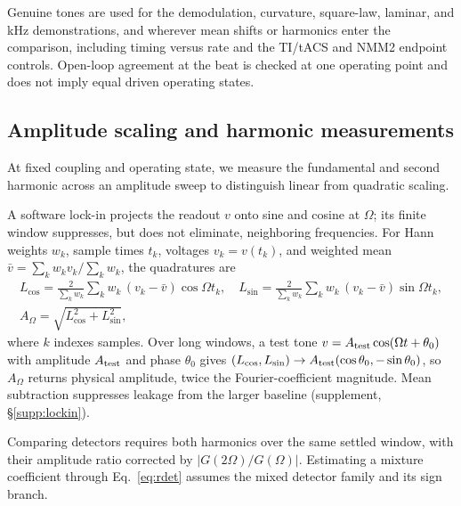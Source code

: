 \documentclass[a4paper]{article}
\newif\ifjne
\begin{document}
Genuine tones are used for the demodulation, curvature, square-law, laminar, and kHz
demonstrations, and wherever mean shifts or harmonics enter the comparison, including
timing versus rate and the TI/tACS and NMM2 endpoint controls. Open-loop agreement at
the beat is checked at one operating point and does not imply equal driven operating
states.

\subsection{Amplitude scaling and harmonic measurements}\label{sec:transduction-methods}
At fixed coupling and operating state, we measure the fundamental and second
harmonic across an amplitude sweep to distinguish linear from quadratic scaling.

A software lock-in projects the readout $v$ onto sine and cosine at $\Omega$; its
finite window suppresses, but does not eliminate, neighboring frequencies. For Hann
weights $w_k$, sample times $t_k$, voltages $v_k=v(t_k)$, and weighted mean
$\bar v=\sum_k w_kv_k/\sum_k w_k$, the quadratures are
\begin{equation}
\begin{gathered}
L_{\cos}=\frac{2}{\sum_k w_k}\sum_k w_k\,(v_k-\bar v)\cos\Omega t_k,\quad
L_{\sin}=\frac{2}{\sum_k w_k}\sum_k w_k\,(v_k-\bar v)\sin\Omega t_k,\\
A_\Omega=\sqrt{L_{\cos}^2+L_{\sin}^2},
\end{gathered}
\label{eq:lockin}
\end{equation}
where $k$ indexes samples. Over long windows, a test tone
$v=A_{\rm test}\cos(\Omega t+\theta_0)$ with amplitude $A_{\rm test}$
and phase $\theta_0$ gives
$(L_{\cos},L_{\sin})\to A_{\rm test}(\cos\theta_0,-\sin\theta_0)$,
so $A_\Omega$ returns physical amplitude, twice the Fourier-coefficient magnitude.
Mean subtraction suppresses leakage from the larger baseline (supplement,
\S\ref{supp:lockin}).

\ifjne\else

\fi

Comparing detectors requires both harmonics over the same settled window, with their
amplitude ratio corrected by $|G(2\Omega)/G(\Omega)|$. Estimating a mixture coefficient
through Eq.~\eqref{eq:rdet} assumes the mixed detector family and its sign branch.
\end{document}

